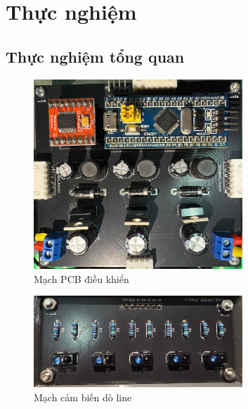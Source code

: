     \section{Thực nghiệm}
          \subsection{Thực nghiệm tổng quan}
               \begin{figure}[H]
                    \centering
                    \includegraphics[width=0.7\textwidth]{pictures/chapter8/PCB.png}
                    \caption{Mạch PCB điều khiển}
                    \label{PCB}
               \end{figure}
               \begin{figure}[H]
                    \centering
                    \includegraphics[width=0.7\textwidth]{pictures/chapter8/sensor.png}
                    \caption{Mạch cảm biến dò line}
                    \label{line_sensor}
               \end{figure}
